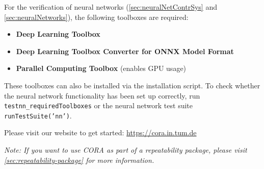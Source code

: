 For the verification of neural networks (\cref{sec:neuralNetContrSys} and \cref{sec:neuralNetworks}),
the following toolboxes are required:
\begin{itemize}
	\item \textbf{Deep Learning Toolbox}
	\item \textbf{Deep Learning Toolbox Converter for ONNX Model Format}
	\item \textbf{Parallel Computing Toolbox} (enables GPU usage)
\end{itemize}

These toolboxes can also be installed via the installation script.
To check whether the neural network functionality has been set up correctly, run \texttt{testnn\_requiredToolboxes} or the neural network test suite \texttt{runTestSuite('nn')}.

Please visit our website to get started: \url{https://cora.in.tum.de}

\textit{
	Note: If you want to use CORA as part of a repeatability package,
	please visit \cref{sec:repeatability-package} for more information.
}
